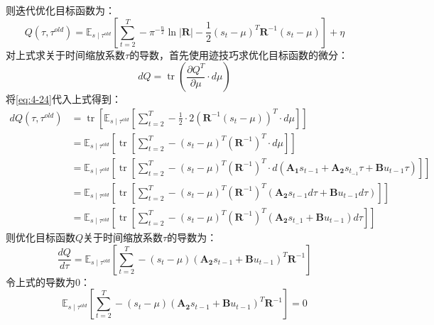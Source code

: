 则迭代优化目标函数为：
\begin{equation}
    Q\left(\tau, \tau^{old}\right)
    =\mathbb{E}_{s \mid \tau^{old}}\left[\sum_{t=2}^T-\pi^{-\frac{n}{2}}\ln\mathbf{|R|}-\frac{1}{2}\left(s_t-\mu\right)^T \mathbf{R}^{-1}\left(s_t-\mu\right)\right] + \eta
    \label{eq:4-24}
\end{equation}
对上式求关于时间缩放系数$\tau$的导数，首先使用迹技巧求优化目标函数的微分：
\begin{equation}
    d Q=\operatorname{tr}\left(\frac{\partial Q^T}{\partial \mu} \cdot d \mu\right)
    \label{eq:4-25}
\end{equation}
将\ref{eq:4-24}代入上式得到：
\begin{equation}
    \begin{aligned}
    d Q\left(\tau, \tau^{old}\right)
    & =\operatorname{tr}\left[\mathbb{E}_{s \mid \tau^{old}}\left[\sum_{t=2}^T-\frac{1}{2} \cdot 2 \left(\mathbf{R}^{-1}\left(s_t-\mu\right)\right)^T \cdot d \mu\right]\right] \\
    & =\mathbb{E}_{s \mid \tau^{old}}\left[\operatorname{tr}\left[\sum_{t=2}^T-\left(s_t-\mu\right)^T \left(\mathbf{R}^{-1}\right)^T \cdot d \mu\right]\right] \\
    & =\mathbb{E}_{s \mid \tau^{old}}\left[\operatorname{tr}\left[\sum_{t=2}^T-\left(s_t-\mu\right)^T \left(\mathbf{R}^{-1}\right)^T \cdot d\left(\mathbf{A_1} s_{t-1}+\mathbf{A_2} s_{t_{-1}} \tau+\mathbf{B} u_{t-1} \tau\right)\right]\right] \\
    & =\mathbb{E}_{s \mid \tau^{old}}\left[\operatorname{tr}\left[\sum_{t=2}^T-\left(s_t-\mu\right)^T \left(\mathbf{R}^{-1}\right)^T\left(\mathbf{A_2}s_{t-1} d \tau+\mathbf{B} u_{t-1} d \tau\right)\right]\right] \\
    & =\mathbb{E}_{s \mid \tau^{old}}\left[\operatorname{tr}\left[\sum_{t=2}^T-\left(s_t-\mu\right)^T \left(\mathbf{R}^{-1}\right)^T(\mathbf{A_2} s_{t_-1}+\mathbf{B} u_{t-1}) d \tau \right]\right]
    \end{aligned}
    \label{eq:4-26}
\end{equation}
则优化目标函数$Q$关于时间缩放系数$\tau$的导数为：
\begin{equation}
    \frac{d Q}{d \tau}=\mathbb{E}_{s \mid \tau^{old}}\left[\sum_{t=2}^T -\left(s_t-\mu\right)\left(\mathbf{A_2} s_{t-1}+\mathbf{B} u_{t-1}\right)^T\mathbf{R}^{-1}\right]
    \label{eq:4-27}
\end{equation}
令上式的导数为0：
\begin{equation}
    \mathbb{E}_{s \mid \tau^{old}}\left[\sum_{t=2}^T -\left(s_t-\mu\right)\left(\mathbf{A_2} s_{t-1}+\mathbf{B} u_{t-1}\right)^T\mathbf{R}^{-1}\right] = 0
    \label{eq:4-28}
\end{equation}
